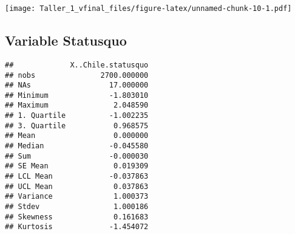 \documentclass[
]{article}
\newenvironment{Shaded}{\begin{snugshade}}{\end{snugshade}}
\newcommand{\AttributeTok}[1]{\textcolor[rgb]{0.77,0.63,0.00}{#1}}
\newcommand{\CommentTok}[1]{\textcolor[rgb]{0.56,0.35,0.01}{\textit{#1}}}
\newcommand{\DecValTok}[1]{\textcolor[rgb]{0.00,0.00,0.81}{#1}}
\newcommand{\FloatTok}[1]{\textcolor[rgb]{0.00,0.00,0.81}{#1}}
\newcommand{\FunctionTok}[1]{\textcolor[rgb]{0.00,0.00,0.00}{#1}}
\newcommand{\NormalTok}[1]{#1}
\newcommand{\OtherTok}[1]{\textcolor[rgb]{0.56,0.35,0.01}{#1}}
\newcommand{\SpecialCharTok}[1]{\textcolor[rgb]{0.00,0.00,0.00}{#1}}
\newcommand{\StringTok}[1]{\textcolor[rgb]{0.31,0.60,0.02}{#1}}
\begin{document}
\texttt{[image: Taller\_1\_vfinal\_files/figure-latex/unnamed-chunk-10-1.pdf]}

\hypertarget{variable-statusquo}{%
\subsection{\texorpdfstring{Variable
\textbf{Statusquo}}{Variable Statusquo}}\label{variable-statusquo}}

\begin{Shaded}
\end{Shaded}

\begin{verbatim}
##             X..Chile.statusquo
## nobs               2700.000000
## NAs                  17.000000
## Minimum              -1.803010
## Maximum               2.048590
## 1. Quartile          -1.002235
## 3. Quartile           0.968575
## Mean                  0.000000
## Median               -0.045580
## Sum                  -0.000030
## SE Mean               0.019309
## LCL Mean             -0.037863
## UCL Mean              0.037863
## Variance              1.000373
## Stdev                 1.000186
## Skewness              0.161683
## Kurtosis             -1.454072
\end{verbatim}

\begin{Shaded}
\end{Shaded}
\end{document}
